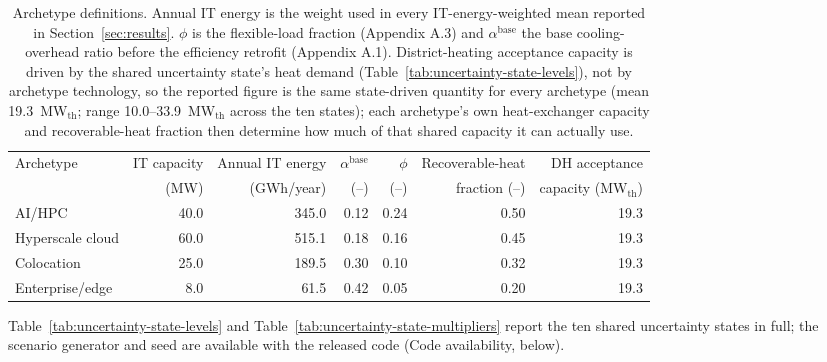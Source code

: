 \documentclass[preprint,12pt]{elsarticle}
\begin{document}
\begin{table}[tbp]
\centering
\scriptsize
\setlength{\tabcolsep}{4pt}
\caption{Archetype definitions. Annual IT energy is the weight used in every IT-energy-weighted mean reported in Section~\ref{sec:results}. $\phi$ is the flexible-load fraction (Appendix A.3) and $\alpha^{\text{base}}$ the base cooling-overhead ratio before the efficiency retrofit (Appendix A.1). District-heating acceptance capacity is driven by the shared uncertainty state's heat demand (Table~\ref{tab:uncertainty-state-levels}), not by archetype technology, so the reported figure is the same state-driven quantity for every archetype (mean 19.3~MW$_{\text{th}}$; range 10.0--33.9~MW$_{\text{th}}$ across the ten states); each archetype's own heat-exchanger capacity and recoverable-heat fraction then determine how much of that shared capacity it can actually use.}
\label{tab:archetypes}
\begin{tabular}{l r r r r r r}
\toprule
Archetype & IT capacity & Annual IT energy & $\alpha^{\text{base}}$ & $\phi$ & Recoverable-heat & DH acceptance \\
 & (MW) & (GWh/year) & (--) & (--) & fraction (--) & capacity (MW$_{\text{th}}$) \\
\midrule
AI/HPC            & 40.0 & 345.0 & 0.12 & 0.24 & 0.50 & 19.3 \\
Hyperscale cloud  & 60.0 & 515.1 & 0.18 & 0.16 & 0.45 & 19.3 \\
Colocation        & 25.0 & 189.5 & 0.30 & 0.10 & 0.32 & 19.3 \\
Enterprise/edge   & 8.0  & 61.5  & 0.42 & 0.05 & 0.20 & 19.3 \\
\bottomrule
\end{tabular}
\end{table}

Table~\ref{tab:uncertainty-state-levels} and Table~\ref{tab:uncertainty-state-multipliers} report the ten shared uncertainty states in full; the scenario generator and seed are available with the released code (Code availability, below).
\end{document}
